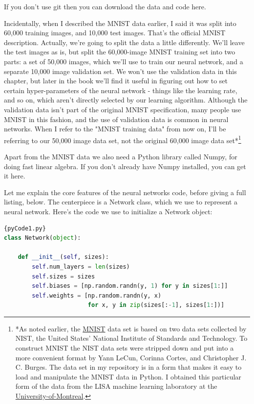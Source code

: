 \documentclass[a4paper,12pt]{report}%
\begin{document}
If you don't use git then you can download the data and code here.

Incidentally, when I described the MNIST data earlier, I said it was split into 60,000 training images, and 10,000 test images. That's the official MNIST description. Actually, we're going to split the data a little differently. We'll leave the test images as is, but split the 60,000-image MNIST training set into two parts: a set of 50,000 images, which we'll use to train our neural network, and a separate 10,000 image validation set. We won't use the validation data in this chapter, but later in the book we'll find it useful in figuring out how to set certain hyper-parameters of the neural network - things like the learning rate, and so on, which aren't directly selected by our learning algorithm. Although the validation data isn't part of the original MNIST specification, many people use MNIST in this fashion, and the use of validation data is common in neural networks. When I refer to the "MNIST training data" from now on, I'll be referring to our 50,000 image data set, not the original 60,000 image data set*\footnote{\color{blue}*As noted earlier, the \href{http://yann.lecun.com/exdb/mnist/}{MNIST} data set is based on two data sets collected by NIST, the United States' National Institute of Standards and Technology. To construct MNIST the NIST data sets were stripped down and put into a more convenient format by Yann LeCun, Corinna Cortes, and Christopher J. C. Burges. The data set in my repository is in a form that makes it easy to load and manipulate the MNIST data in Python. I obtained this particular form of the data from the LISA machine learning laboratory at the \href{http://www.deeplearning.net/tutorial/gettingstarted.htm}{University-of-Montreal}.}

Apart from the MNIST data we also need a Python library called Numpy, for doing fast linear algebra. If you don't already have Numpy installed, you can get it here.

Let me explain the core features of the neural networks code, before giving a full listing, below. The centerpiece is a Network class, which we use to represent a neural network. Here's the code we use to initialize a Network object:
\begin{lstlisting}[language=Python,breaklines,basicstyle=\footnotesize\ttfamily]{pyCode1.py}
class Network(object):

    def __init__(self, sizes):
        self.num_layers = len(sizes)
        self.sizes = sizes
        self.biases = [np.random.randn(y, 1) for y in sizes[1:]]
        self.weights = [np.random.randn(y, x)
                        for x, y in zip(sizes[:-1], sizes[1:])]
\end{lstlisting}
\end{document}
